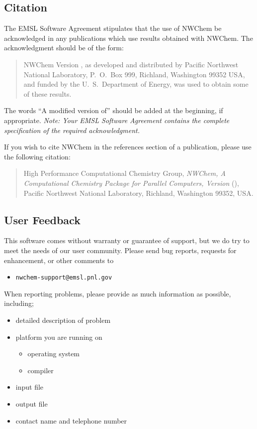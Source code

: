 \subsection{Citation}

The EMSL Software Agreement stipulates that the use of NWChem be
acknowledged in any publications which use results obtained with
NWChem.  The acknowledgment should be of the form:
\begin{quote}

  NWChem Version \nwchemversion, as developed and distributed by
  Pacific Northwest National Laboratory, P.~O.~Box 999, Richland,
  Washington 99352 USA, and funded by the U.~S.~Department of Energy,
  was used to obtain some of these results.
\end{quote}

The words ``A modified version of'' should be added at the beginning,
if appropriate.  {\em Note: Your EMSL Software Agreement contains the
complete specification of the required acknowledgment.}

If you wish to cite NWChem in the references section of a publication,
please use the following citation:
\begin{quote}
  High Performance Computational Chemistry Group, {\em NWChem, A
   Computational Chemistry Package for Parallel Computers, Version
    \nwchemversion{}} (\nwchemyear), Pacific Northwest National
  Laboratory, Richland, Washington 99352, USA.
\end{quote}

\subsection{User Feedback}

This software comes without warranty or guarantee of support,
but we do try to meet the needs of our user community.  Please send bug
reports, requests for enhancement, or other comments to

\begin{itemize}
\item {\tt nwchem-support@emsl.pnl.gov}
\end{itemize}

When reporting problems, please provide as much information as possible, 
including;

\begin{itemize}
\item detailed description of problem
\item platform you are running on
\begin{itemize}
\item operating system
\item compiler
\end{itemize}
\item input file
\item output file
\item contact name and telephone number
\end{itemize}


